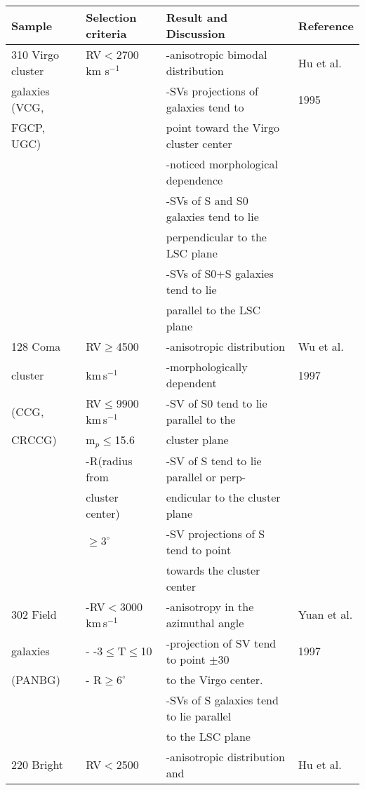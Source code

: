 \begin{center}
\begin{tabular}[lp=7cm]{|l|l|l|l|}
\hline\hline
Sample		 		& Selection criteria 			& Result and Discussion 					& Reference\\
\hline
310 Virgo cluster 	&RV$<$2700 km s$^{-1}$			&-anisotropic bimodal distribution		&Hu et al.\\
galaxies (VCG, 		&								&-SVs projections of galaxies tend to	&1995\\
FGCP, UGC)			&								&point toward the Virgo cluster center	&\\
					&								&-noticed morphological dependence		&\\
					&								&-SVs of S and S0 galaxies tend to lie	&\\
					&								& perpendicular to the LSC plane			&\\
					&								&-SVs of S0+S galaxies tend to lie 		&\\
					&								&parallel to the LSC plane				&\\
					\hline
128 Coma 			&RV$\geq$4500					&-anisotropic distribution				&Wu et al.\\
cluster 				&km\,s$^{-1}$						&-morphologically dependent				&1997\\
(CCG,				&RV$\leq$9900 km\,s$^{-1}$		&-SV of S0 tend to lie parallel to the	&\\
CRCCG)				&m$_p\leq$15.6					&cluster plane							&\\
					&-R(radius from			&-SV of S tend to lie parallel or perp-	&\\
					&cluster center)					&endicular to the cluster plane			&\\
					&$\geq3^\circ$					&-SV projections of S tend to point 		&\\
					&								&towards the cluster center				&\\
					\hline
302 Field			&-RV$<$3000 km\,s$^{-1}$			&-anisotropy in the azimuthal angle		&Yuan et al.\\
galaxies				&- -3$\leq$T$\leq$10				&-projection of SV tend to point $\pm$30&1997\\
(PANBG)				&- R$\geq6^\circ$				&to the Virgo center.					&\\
					&								&-SVs of S galaxies tend to lie parallel	&\\
					&								&to the LSC plane						&\\
					\hline
220 Bright & RV$<$2500&-anisotropic distribution and&Hu et al.\\

\end{tabular}
\end{center}
